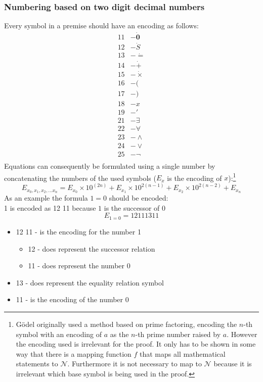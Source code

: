 \documentclass[english,12pt]{article}
\begin{document}
\subsubsection{Numbering based on two digit decimal numbers}
Every symbol in a premise should have an encoding as follows:
\begin{align*}
    11 & - \mathbf{\dot 0}\\
    12 & - \dot S\\
    13 & - \dot =\\
    14 & - \dot +\\
    15 & - \dot \times\\
    16 & - \text{(}\\
    17 & - \text{)}\\
    18 & - x\\
    19 & - '\\
    21 & - \exists\\
    22 & - \forall\\
    23 & - \land\\
    24 & - \lor\\
    25 & - \neg\\
\end{align*}
Equations can consequently be formulated using a single number by concatenating the numbers of the used symbols ($E_x$ is the encoding of $x$):\footnote{Gödel originally used a method based on prime factoring, encoding the $n$-th symbol with an encoding of $a$ as the $n$-th prime number raised by $a$. However the encoding used is irrelevant for the proof. It only has to be shown in some way that there is a mapping function $f$ that maps all mathematical statements to $\mathcal{N}$. Furthermore it is not necessary to map to $\mathcal{N}$ because it is irrelevant which base symbol is being used in the proof.}
$$
    E_{x_0, x_1, x_2, \dots x_n} = E_{x_0} \times 10^{(2n)} + E_{x_1} \times 10^{2(n - 1)} + E_{x_2} \times 10^{2(n - 2)} + E_{x_n}
$$
As an example the formula $1 = 0$ should be encoded:\\
1 is encoded as 12 11 because $1$ is the successor of $0$
$$
    E_{1 = 0} = 12111311
$$
\begin{itemize}
    \item 12 11 - is the encoding for the number 1
    \begin{itemize}
        \item 12 - does represent the successor relation
        \item 11 - does represent the number 0
    \end{itemize}
    \item 13 - does represent the equality relation symbol
    \item 11 - is the encoding of the number 0
\end{itemize}
\end{document}
